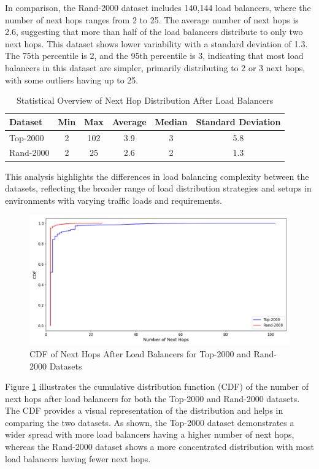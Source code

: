 \documentclass[12pt]{cwru_thesis}
\begin{document}
In comparison, the Rand-2000 dataset includes 140,144 load balancers, where the number of next hops ranges from 2 to 25. The average number of next hops is 2.6, suggesting that more than half of the load balancers distribute to only two next hops. This dataset shows lower variability with a standard deviation of 1.3. The 75th percentile is 2, and the 95th percentile is 3, indicating that most load balancers in this dataset are simpler, primarily distributing to 2 or 3 next hops, with some outliers having up to 25.

\begin{table}[h]
\centering
\begin{tabular}{|l|c|c|c|c|c|}
\hline
\textbf{Dataset} & \textbf{Min} & \textbf{Max} & \textbf{Average} & \textbf{Median} & \textbf{Standard Deviation} \\
\hline
Top-2000 & 2 & 102 & 3.9 & 3 & 5.8 \\
Rand-2000 & 2 & 25 & 2.6 & 2 & 1.3 \\
\hline
\end{tabular}
\caption{Statistical Overview of Next Hop Distribution After Load Balancers}
\label{tab:next_hop_stats}
\end{table}

This analysis highlights the differences in load balancing complexity between the datasets, reflecting the broader range of load distribution strategies and setups in environments with varying traffic loads and requirements.

\begin{figure}[h]
    \centering
    \includegraphics[width=\linewidth]{figures/cdf_next_hops.png}
    \caption{CDF of Next Hops After Load Balancers for Top-2000 and Rand-2000 Datasets}
    \label{fig:cdf_next_hops}
\end{figure}

Figure \ref{fig:cdf_next_hops} illustrates the cumulative distribution function (CDF) of the number of next hops after load balancers for both the Top-2000 and Rand-2000 datasets. The CDF provides a visual representation of the distribution and helps in comparing the two datasets. As shown, the Top-2000 dataset demonstrates a wider spread with more load balancers having a higher number of next hops, whereas the Rand-2000 dataset shows a more concentrated distribution with most load balancers having fewer next hops.
\end{document}
